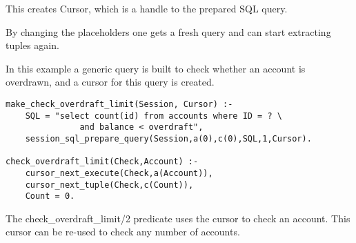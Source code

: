 This creates Cursor, which is a handle to the prepared SQL query.

By changing the placeholders one gets a fresh query and can start extracting
tuples again.


In this example a generic query is built to check whether an account is
overdrawn, and a cursor for this query is created.
\begin{verbatim}
make_check_overdraft_limit(Session, Cursor) :-
    SQL = "select count(id) from accounts where ID = ? \
               and balance < overdraft",
    session_sql_prepare_query(Session,a(0),c(0),SQL,1,Cursor).

check_overdraft_limit(Check,Account) :-
    cursor_next_execute(Check,a(Account)),
    cursor_next_tuple(Check,c(Count)),
    Count = 0.
\end{verbatim}
The check_overdraft_limit/2 predicate uses the cursor to check an account.
This cursor can be re-used to check any number of accounts.


